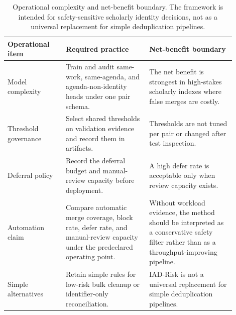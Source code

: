 \documentclass[11pt]{article}
\begin{document}
\begin{table}[H]
\caption{Operational complexity and net-benefit boundary. The framework is intended for safety-sensitive scholarly identity decisions, not as a universal replacement for simple deduplication pipelines.}
\label{tab:operational-net-benefit}
\centering
\footnotesize
\setlength{\tabcolsep}{3pt}
\begin{tabular}{L{0.23\linewidth}L{0.33\linewidth}L{0.34\linewidth}}
\toprule
Operational item & Required practice & Net-benefit boundary \\
\midrule
Model complexity & Train and audit same-work, same-agenda, and agenda-non-identity heads under one pair schema. & The net benefit is strongest in high-stakes scholarly indexes where false merges are costly. \\
Threshold governance & Select shared thresholds on validation evidence and record them in artifacts. & Thresholds are not tuned per pair or changed after test inspection. \\
Deferral policy & Record the deferral budget and manual-review capacity before deployment. & A high defer rate is acceptable only when review capacity exists. \\
Automation claim & Compare automatic merge coverage, block rate, defer rate, and manual-review capacity under the predeclared operating point. & Without workload evidence, the method should be interpreted as a conservative safety filter rather than as a throughput-improving pipeline. \\
Simple alternatives & Retain simple rules for low-risk bulk cleanup or identifier-only reconciliation. & IAD-Risk is not a universal replacement for simple deduplication pipelines. \\
\bottomrule
\end{tabular}
\end{table}
\end{document}
